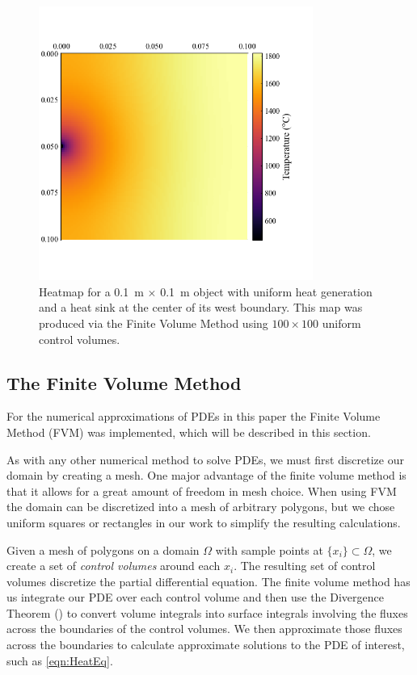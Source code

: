 \begin{figure}
	\centering
	\includegraphics[width=0.8\textwidth]{Chapter_I_Background/Images/Heatmap_Example.png}
	\caption[Heatmap Example]{Heatmap for a \SI{0.1}{\meter} $\times$ \SI{0.1}{\meter} object with uniform heat generation and a heat sink at the center of its west boundary. This map was produced via the Finite Volume Method using $100\times 100$ uniform control volumes.}
	\label{fig:heatmap-example}
\end{figure}

\subsection{The Finite Volume Method}

For the numerical approximations of PDEs in this paper the Finite Volume Method (FVM) was implemented, which will be described in this section.

As with any other numerical method to solve PDEs, we must first discretize our domain by creating a mesh. One major advantage of the finite volume method is that it allows for a great amount of freedom in mesh choice. When using FVM the domain can be discretized into a mesh of arbitrary polygons, but we chose uniform squares or rectangles in our work to simplify the resulting calculations.

Given a mesh of polygons on a domain $\Omega$ with sample points at $\lbrace x_i\rbrace\subset\Omega$, we create a set of \textit{control volumes} around each $x_i$. The resulting set of control volumes discretize the partial differential equation. The finite volume method has us integrate our PDE over each control volume and then use the Divergence Theorem () to convert volume integrals into surface integrals involving the fluxes across the boundaries of the control volumes. We then approximate those fluxes across the boundaries to calculate approximate solutions to the PDE of interest, such as \eqref{eqn:HeatEq}.

